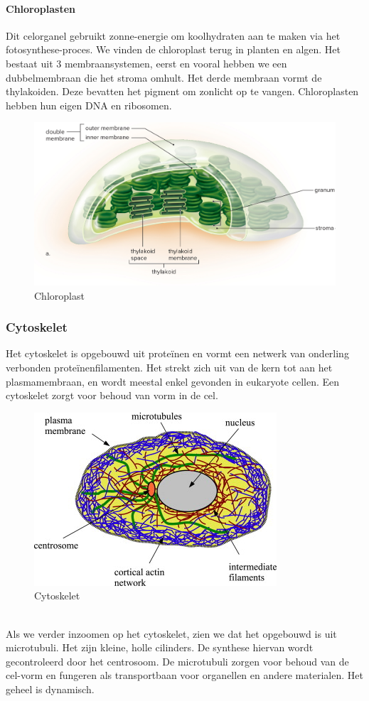 \documentclass[a4paper,kul]{kulakarticle} %
\begin{document}
\paragraph{Chloroplasten}
Dit celorganel gebruikt zonne-energie om koolhydraten aan te maken via het fotosynthese-proces. We vinden de chloroplast terug in planten en algen. Het bestaat uit 3 membraansystemen, eerst en vooral hebben we een dubbelmembraan die het stroma omhult. Het derde membraan vormt de thylakoiden. Deze bevatten het pigment om zonlicht op te vangen. Chloroplasten hebben hun eigen DNA en ribosomen.  
\begin{figure}[h]
	\centering
	\includegraphics[width=0.7\linewidth]{Chloroplast}
	\caption[Chloroplast]{Chloroplast}
	\label{fig:chloroplast}
\end{figure}
\newpage
\subsubsection{Cytoskelet}
Het cytoskelet is opgebouwd uit proteïnen en vormt een netwerk van onderling verbonden proteïnenfilamenten. Het strekt zich uit van de kern tot aan het plasmamembraan, en wordt meestal enkel gevonden in eukaryote cellen. Een cytoskelet zorgt voor behoud van vorm in de cel.
\begin{figure}[h]
	\centering
	\includegraphics[width=0.5\linewidth]{Cytoskelet}
	\caption[Cytoskelet]{Cytoskelet}
	\label{fig:cytoskelet}
\end{figure}\\
Als we verder inzoomen op het cytoskelet, zien we dat het opgebouwd is uit microtubuli. Het zijn kleine, holle cilinders. De synthese hiervan wordt gecontroleerd door het centrosoom. De microtubuli zorgen voor behoud van de cel-vorm en fungeren als transportbaan voor organellen en andere materialen. Het geheel is dynamisch.
\end{document}
